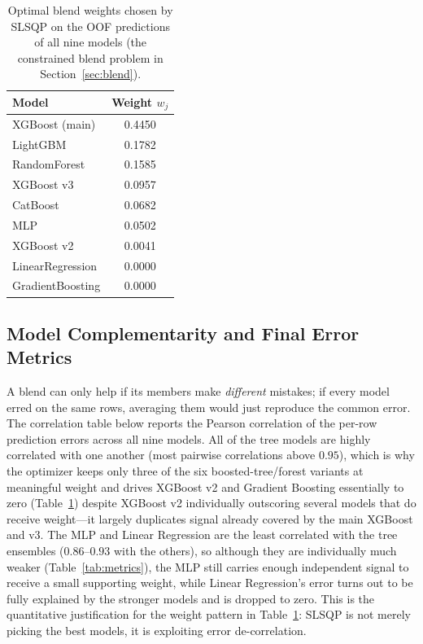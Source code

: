 \documentclass[journal]{IEEEtran}
\begin{document}
\begin{table}[!t]
\caption{Optimal blend weights chosen by SLSQP on the OOF predictions of all
nine models (the constrained blend problem in Section~\ref{sec:blend}).}
\label{tab:weights}
\centering
\begin{tabular}{lc}
\toprule
Model & Weight $w_j$ \\
\midrule
XGBoost (main) & 0.4450 \\
LightGBM & 0.1782 \\
RandomForest & 0.1585 \\
XGBoost v3 & 0.0957 \\
CatBoost & 0.0682 \\
MLP & 0.0502 \\
XGBoost v2 & 0.0041 \\
LinearRegression & 0.0000 \\
GradientBoosting & 0.0000 \\
\bottomrule
\end{tabular}
\end{table}

\subsection{Model Complementarity and Final Error Metrics}
\label{sec:complementarity}
A blend can only help if its members make \emph{different} mistakes; if every
model erred on the same rows, averaging them would just reproduce the common
error. The correlation table below reports the Pearson correlation of the per-row
prediction errors across all nine models. All of the tree models are highly
correlated with one another (most pairwise correlations above $0.95$), which is
why the optimizer keeps only three of the six boosted-tree/forest variants at
meaningful weight and drives XGBoost v2 and Gradient Boosting essentially to
zero (Table~\ref{tab:weights}) despite XGBoost v2 individually outscoring
several models that do receive weight---it largely duplicates signal already
covered by the main XGBoost and v3. The MLP and Linear Regression are the
least correlated with the tree ensembles ($0.86$--$0.93$ with the others), so
although they are individually much weaker (Table~\ref{tab:metrics}), the MLP
still carries enough independent signal to receive a small supporting weight,
while Linear Regression's error turns out to be fully explained by the
stronger models and is dropped to zero. This is the quantitative justification
for the weight pattern in Table~\ref{tab:weights}: SLSQP is not merely picking
the best models, it is exploiting error de-correlation.
\end{document}
